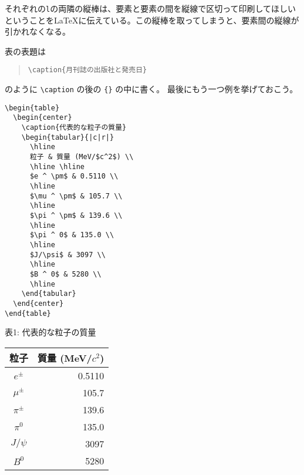 それぞれの\texttt{l}の両隣の縦棒は、要素と要素の間を縦線で区切って印刷してほしいということを\LaTeX に伝えている。この縦棒を取ってしまうと、要素間の縦線が引かれなくなる。

表の表題は
\begin{quotation}
  \verb|\caption{月刊誌の出版社と発売日}|
\end{quotation}
のように \verb|\caption| の後の \verb|{}| の中に書く。
最後にもう一つ例を挙げておこう。
\begin{reidai}
\begin{verbatim}
\begin{table}
  \begin{center}
    \caption{代表的な粒子の質量}
    \begin{tabular}{|c|r|}
      \hline
      粒子 & 質量 (MeV/$c^2$) \\
      \hline \hline
      $e ^ \pm$ & 0.5110 \\
      \hline
      $\mu ^ \pm$ & 105.7 \\
      \hline
      $\pi ^ \pm$ & 139.6 \\
      \hline
      $\pi ^ 0$ & 135.0 \\
      \hline
      $J/\psi$ & 3097 \\
      \hline
      $B ^ 0$ & 5280 \\
      \hline
    \end{tabular}
  \end{center}
\end{table}
\end{verbatim}
\end{reidai}
\vspace*{-1.5em}
\begin{kekka}
  \begin{center}
    表1: 代表的な粒子の質量 \\
    \begin{tabular}{|c|r|}
      \hline
      粒子 & 質量 (MeV/$c^2$) \\
      \hline \hline
      $e ^ \pm$ & 0.5110 \\
      \hline
      $\mu ^ \pm$ & 105.7 \\
      \hline
      $\pi ^ \pm$ & 139.6 \\
      \hline
      $\pi ^ 0$ & 135.0 \\
      \hline
      $J/\psi$ & 3097 \\
      \hline
      $B ^ 0$ & 5280 \\
      \hline
    \end{tabular}
  \end{center}
\end{kekka}

